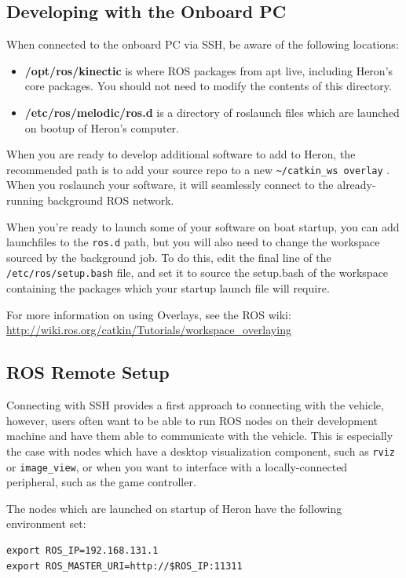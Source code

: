 \documentclass[]{clearpath-latex/clearpath-manual}
\begin{document}
\subsection{Developing with the Onboard PC}
When connected to the onboard PC via SSH, be aware of the following locations:

\begin{itemize}[nolistsep]
	\item \textbf{/opt/ros/kinectic} is where ROS packages from apt live, including Heron’s core packages. You should not need to modify the contents of this directory.
	\item \textbf{/etc/ros/melodic/ros.d} is a directory of roslaunch files which are launched on bootup of Heron's computer.
\end{itemize}

When you are ready to develop additional software to add to Heron, the recommended path is to add your source repo to a new \lstinline{~/catkin_ws overlay} . When you roslaunch your software, it will seamlessly connect to the already-running background ROS network.

When you’re ready to launch some of your software on boat startup, you can add launchfiles to the \lstinline{ros.d} path, but you will also need to change the workspace sourced by the background job. To do this, edit the final line of the \lstinline{/etc/ros/setup.bash} file, and set it to source the setup.bash of the workspace containing the packages which your startup launch file will require.

For more information on using Overlays, see the ROS wiki: \url{http://wiki.ros.org/catkin/Tutorials/workspace_overlaying}

\subsection{ROS Remote Setup}
Connecting with SSH provides a first approach to connecting with the vehicle, however, users often want to be able to run ROS nodes on their development machine and have them able to communicate with the vehicle. This is especially the case with nodes which have a desktop visualization component, such as \lstinline{rviz} or \lstinline{image_view}, or when you want to interface with a locally-connected peripheral, such as the game controller.

The nodes which are launched on startup of Heron have the following environment set:

\begin{lstlisting}
export ROS_IP=192.168.131.1
export ROS_MASTER_URI=http://$ROS_IP:11311
\end{lstlisting}
\end{document}
